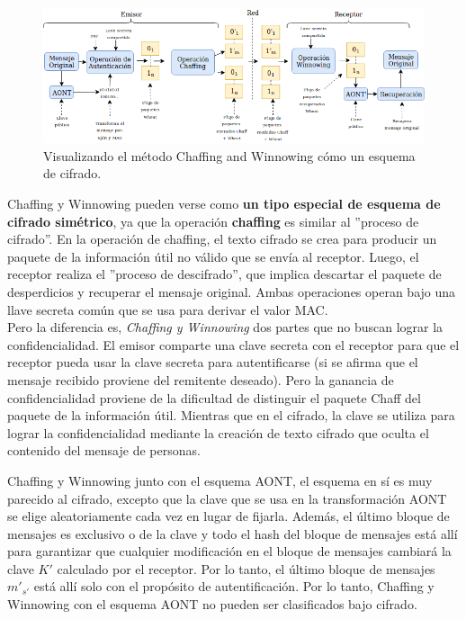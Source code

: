 \documentclass[12pt, a4paper, titlepage]{report}
\begin{document}
        \begin{figure}[H]
			\begin{center}	                  \includegraphics[width=14cm]{./imagenes/MarcoTeorico/chaffVsCrypto.png}
				\caption{Visualizando el método Chaffing and Winnowing cómo un esquema de cifrado.}
			\end{center}
		\end{figure}
        
        Chaffing y Winnowing pueden verse como \textbf{un tipo especial de esquema de cifrado simétrico}, ya que la operación \textbf{chaffing} es similar al ''proceso de cifrado''. En la operación de chaffing, el texto cifrado se crea para producir un paquete de la informaci\'on \'util no válido que se envía al receptor. Luego, el receptor realiza el ''proceso de descifrado'', que implica descartar el paquete de desperdicios y recuperar el mensaje original. Ambas operaciones operan bajo una llave secreta común que se usa para derivar el valor MAC.\\
        
        Pero la diferencia es, \textit{Chaffing y Winnowing} dos partes que no buscan lograr la confidencialidad. El emisor comparte una clave secreta con el receptor para que el receptor pueda usar la clave secreta para autentificarse (si se afirma que el mensaje recibido proviene del remitente deseado). Pero la ganancia de confidencialidad proviene de la dificultad de distinguir el paquete Chaff del paquete de la informaci\'on \'util. Mientras que en el cifrado, la clave se utiliza para lograr la confidencialidad mediante la creación de texto cifrado que oculta el contenido del mensaje de personas.
        
        Chaffing y Winnowing junto con el esquema AONT, el esquema en sí es muy parecido al cifrado, excepto que la clave que se usa en la transformación AONT se elige aleatoriamente cada vez en lugar de fijarla. Además, el último bloque de mensajes es exclusivo o de la clave y todo el hash del bloque de mensajes está allí para garantizar que cualquier modificación en el bloque de mensajes cambiará la clave $K'$ calculado por el receptor. Por lo tanto, el último bloque de mensajes ${m'}_{s'}$ está allí solo con el propósito de autentificación. Por lo tanto, Chaffing y Winnowing con el esquema AONT no pueden ser clasificados bajo cifrado.\\
        
\end{document}
